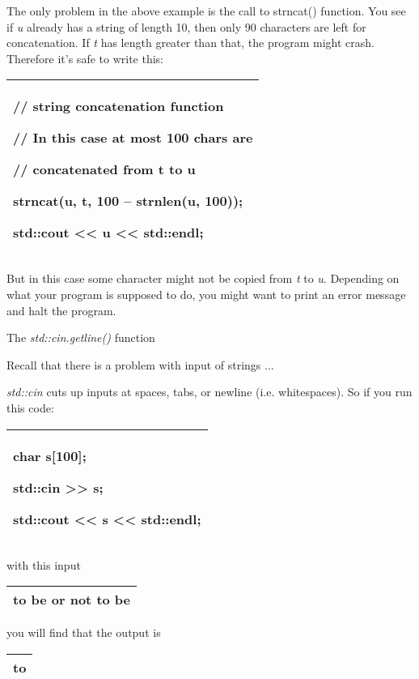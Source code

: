 \documentclass[
]{article}
\begin{document}
The only problem in the above example is the call to strncat() function.
You see if \emph{u} already has a string of length 10, then only 90
characters are left for concatenation. If \emph{t} has length greater
than that, the program might crash. Therefore it's safe to write this:

\begin{longtable}[]{@{}l@{}}
\toprule
\endhead
\begin{minipage}[t]{0.97\columnwidth}\raggedright
// string concatenation function

// In this case at most 100 chars are

// concatenated from t to u

strncat(u, t, 100 -- strnlen(u, 100));

std::cout \textless\textless{} u \textless\textless{} std::endl;\strut
\end{minipage}\tabularnewline
\bottomrule
\end{longtable}

But in this case some character might not be copied from \emph{t} to
\emph{u}. Depending on what your program is supposed to do, you might
want to print an error message and halt the program.

The \emph{std::cin.getline()} function

Recall that there is a problem with input of strings ...

\emph{std::cin} cuts up inputs at spaces, tabs, or newline (i.e.
whitespaces). So if you run this code:

\begin{longtable}[]{@{}l@{}}
\toprule
\endhead
\begin{minipage}[t]{0.97\columnwidth}\raggedright
char s{[}100{]};

std::cin \textgreater\textgreater{} s;

std::cout \textless\textless{} s \textless\textless{} std::endl;\strut
\end{minipage}\tabularnewline
\bottomrule
\end{longtable}

with this input

\begin{longtable}[]{@{}l@{}}
\toprule
\endhead
to be or not to be\tabularnewline
\bottomrule
\end{longtable}

you will find that the output is

\begin{longtable}[]{@{}l@{}}
\toprule
\endhead
to\tabularnewline
\bottomrule
\end{longtable}
\end{document}
